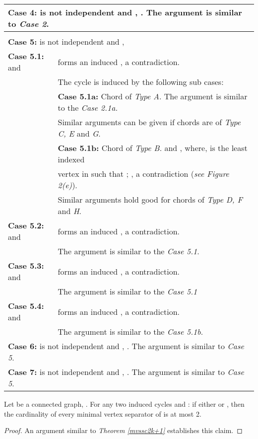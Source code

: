 \documentclass[runningheads]{llncs}
\begin{document}
\begin{table}[H]
\begin{tabular}{|l|l|}
\multicolumn{2}{|l|}{\textbf{Case 4:}  is not independent and , . The argument is similar to \emph{Case 2}.} \\ \hline

\multicolumn{2}{l}{\textbf{ }} \\
\multicolumn{2}{l}{\textbf{Case 5:}  is not independent and ,  }\\ \hline
\textbf{Case 5.1:}  and  &  forms an induced , a contradiction. \\ \hline
& The cycle is induced by the following sub cases:\\ \cline{2-2}

& \textbf{Case 5.1a:} Chord of \emph{Type A}.  The argument is similar to the \emph{Case 2.1a.} \\ & Similar arguments can be given if chords are of \emph{Type C, E} and \emph{G}. \\ \cline{2-2}
& \textbf{Case 5.1b:} Chord of \emph{Type B}.  and , where,  is the least indexed \\ 
 &vertex in  such that ; , a contradiction (\emph{see Figure 2(e)}). \\ 
 & Similar arguments hold good for chords of \emph{Type D, F} and \emph{H}. \\ \hline  
\textbf{Case 5.2:}  and  &   forms an induced , a contradiction. \\
& The argument is similar to the \emph{Case 5.1}.\\
 \hline
\textbf{Case 5.3:}  and  &   forms an induced , a contradiction. \\
& The argument is similar to the \emph{Case 5.1}\\
 \hline
\textbf{Case 5.4:}  and  &    forms an induced , a contradiction. \\ 
& The argument is similar to the \emph{Case 5.1b}.\\
 \hline
\multicolumn{2}{|l|}{\textbf{Case 6:}  is not independent and , . The argument is similar to \emph{Case 5}. }\\ \hline
\multicolumn{2}{|l|}{\textbf{Case 7:}  is not independent and , . The argument is similar to \emph{Case 5}. }\\ \hline
\end{tabular}
\end{table}



\begin{lemma}
\label{mvssck}
Let  be a connected  graph, . For any two induced cycles  and : if either  or , then the cardinality of every minimal vertex separator of  is at most 2.
\end{lemma}
\begin{proof}
An argument similar to \emph{Theorem \ref{mvssc2k+1}} establishes this claim. 
\end{proof}
\end{document}
